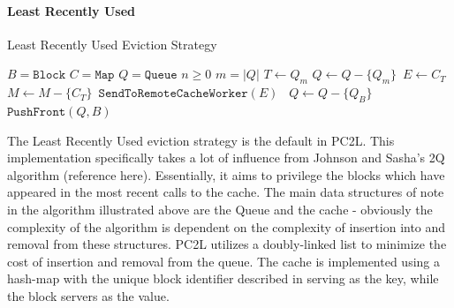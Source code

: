 \paragraph{Least Recently Used}
\begin{algorithm}
    \caption{Least Recently Used Eviction Strategy}
    \begin{algorithmic}[1]
        \State $B = \texttt{Block}$
        \State $C = \texttt{Map}$
        \State $Q = \texttt{Queue}$
        \State $n \ge 0$
        \State $m = |Q|$
                \State $T \gets Q_m$
                \State $Q \gets Q - \{Q_m\}$\
                \State $E \gets C_T$\
                \State $M \gets M - \{C_T\}$\
                \State $\texttt{SendToRemoteCacheWorker}(E)$\
            \EndIf
        \Else
            \State $Q \gets Q - \{Q_B\}$
        \EndIf
        \State $\texttt{PushFront}(Q, B)$
    \end{algorithmic}
\end{algorithm}
The Least Recently Used eviction strategy is the default in PC2L. This implementation specifically takes a lot of influence from Johnson and Sasha's 2Q algorithm (reference here). Essentially, it aims to privilege the blocks which have appeared in the most recent calls to the cache. The main data structures of note in the algorithm illustrated above are the Queue and the cache - obviously the complexity of the algorithm is dependent on the complexity of insertion into and removal from these structures. PC2L utilizes a doubly-linked list to minimize the cost of insertion and removal from the queue. The cache is implemented using a hash-map with the unique block identifier described in \label{block_div} serving as the key, while the block servers as the value. 

